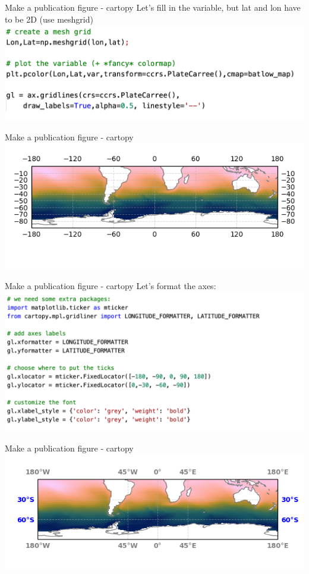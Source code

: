 \begin{frame}{\insertsectionnumber{ |} Make a publication figure - cartopy} 
    Let's fill in the variable, but lat and lon have to be  2D (use meshgrid)
    \includegraphics[scale=0.35]{images/Script4_step3.png}
\end{frame}


\begin{frame}{\insertsectionnumber{ |} Make a publication figure - cartopy} 
    \includegraphics[scale=0.50]{images/script2_fig2.png}
\end{frame}
 
 
\begin{frame}{\insertsectionnumber{ |} Make a publication figure - cartopy} 
    Let's format the axes:
    \includegraphics[scale=0.35]{images/Script4_step4.png}
\end{frame}


\begin{frame}{\insertsectionnumber{ |} Make a publication figure - cartopy} 
    \includegraphics[scale=0.50]{images/script2_fig3.png}
\end{frame}


